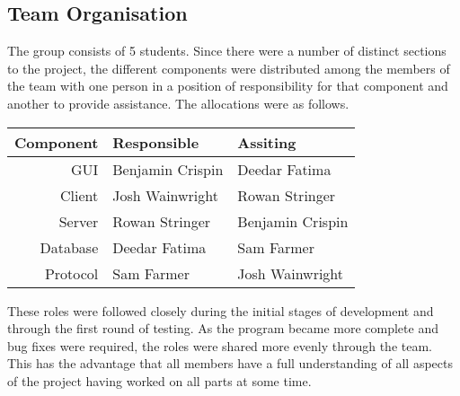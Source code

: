 \subsection{Team Organisation}
\label{ssec:team_organisation}

The group consists of 5 students. Since there were a number of distinct
sections to the project, the different components were distributed among the
members of the team with one person in a position of responsibility for that
component and another to provide assistance. The allocations were as follows.

\begin{table}[htbp]
	\centering
	\begin{tabular}{@{}rll@{}}
		\toprule
\textbf{Component} & \textbf{Responsible} & \textbf{Assiting} \\ \midrule
		GUI              & Benjamin Crispin & Deedar Fatima    \\
		Client           & Josh Wainwright  & Rowan Stringer   \\
		Server           & Rowan Stringer   & Benjamin Crispin \\
		Database         & Deedar Fatima    & Sam Farmer       \\
		Protocol         & Sam Farmer       & Josh Wainwright  \\
		\bottomrule
	\end{tabular}
\end{table}

These roles were followed closely during the initial stages of development and
through the first round of testing. As the program became more complete and bug
fixes were required, the roles were shared more evenly through the team. This
has the advantage that all members have a full understanding of all aspects of
the project having worked on all parts at some time.
